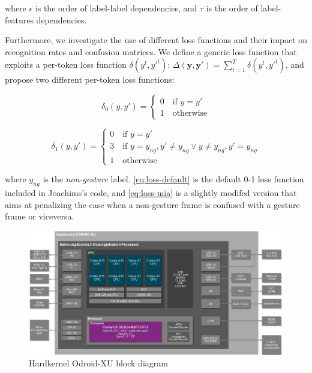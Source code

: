 where $\epsilon$ is the order of label-label dependencies, and $\tau$ is the order of label-features dependencies.

Furthermore, we investigate the use of different loss functions and their impact on recognition rates and confusion matrices. We define a generic loss function that exploits a per-token loss function $\delta(y^t,y'^t)$: $\Delta(\mathbf{y},\mathbf{y'}) = \sum_{t=1}^T \delta(y^t,y'^t)$, and propose two different per-token loss functions:

\begin{equation}
\delta_0(y,y') = \begin{cases} 0 \quad \text{if } y= y'  \\ 
1 \quad \text{otherwise}\end{cases}
\label{eq:loss-default}
\end{equation}

\begin{equation}
\delta_1(y,y') = \begin{cases} 0 \quad \text{if } y= y'  \\ 
3 \quad \text{if } y=y_{ng}, y' \neq y_{ng} \lor y\neq y_{ng}, y'=y_{ng}  \\
1 \quad \text{otherwise}\end{cases}
\label{eq:loss-mia}
\end{equation}

where $y_{ng}$ is the \textit{non-gesture} label. \ref{eq:loss-default} is the default 0-1 loss function included in Joachims's code, and \ref{eq:loss-mia} is a slightly modifed version that aims at penalizing the case when a non-gesture frame is confused with a gesture frame or viceversa.




\begin{figure}[t!]
\centering
\includegraphics[width=0.9\linewidth]{Figures/Hardkernel-ODROID-XU-block_diagram.jpg}
\caption{Hardkernel Odroid-XU block diagram}
\label{odroid-xu}
\end{figure}


